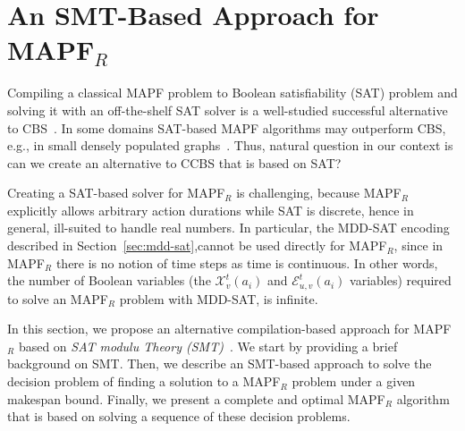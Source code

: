 \documentclass[review]{elsarticle}
\newcommand{\history}{past-conflicts\xspace}
\newcommand\roni[1]{\nb{\textbf{Roni:}}{green}{#1}}
\newcommand\pavel[1]{\nb{\textbf{Pavel:}}{blue}{#1}}
\newcommand{\ccbs}{\ac{CCBS}\xspace}
\newcommand{\cbs}{\ac{CBS}\xspace}
\newcommand{\mapfr}{\ac{MAPF}$_R$\xspace}
\newcommand{\mapf}{\ac{MAPF}\xspace}
\begin{document}


\section{An SMT-Based Approach for \mapfr}

Compiling a classical \mapf problem to Boolean satisfiability (SAT) problem and solving it with an off-the-shelf SAT solver is a well-studied successful alternative to \cbs~\cite{surynek2012towards,surynek14compact,DBLP:conf/ecai/SurynekFSB16}. In some domains SAT-based \mapf algorithms may outperform \cbs, e.g., in small densely populated graphs~\cite{surynekFSB16comparison,surynek17expansion}. %
Thus, natural question in our context is can we create an alternative to \ccbs that is based on SAT?

Creating a SAT-based solver for \mapfr is challenging, because \mapfr explicitly allows arbitrary action durations while SAT is discrete, hence in general, ill-suited to handle real numbers. 
In particular, the MDD-SAT encoding described in Section~\ref{sec:mdd-sat},cannot be used directly for \mapfr, since in \mapfr there is no notion of time steps as time is continuous. 
In other words, the number of Boolean variables (the 
$\mathcal{X}_{v}^{t}(a_i)$ and 
$\mathcal{E}_{u,v}^{t}(a_i)$ variables) required to solve an \mapfr problem with MDD-SAT, is infinite. 

In this section, we propose an alternative compilation-based approach for \mapfr based on \emph{SAT modulu Theory (SMT)}~\cite{DBLP:journals/jacm/NieuwenhuisOT06,DBLP:journals/constraints/BofillPSV12,DBLP:conf/cp/Nieuwenhuis10}. We start by providing a brief background on SMT. 
Then, we describe an SMT-based approach to solve the decision problem of finding a solution to a \mapfr problem under a given makespan bound. 
Finally, we present a complete and optimal \mapfr algorithm that is based on solving a sequence of these decision problems. 


\end{document}
